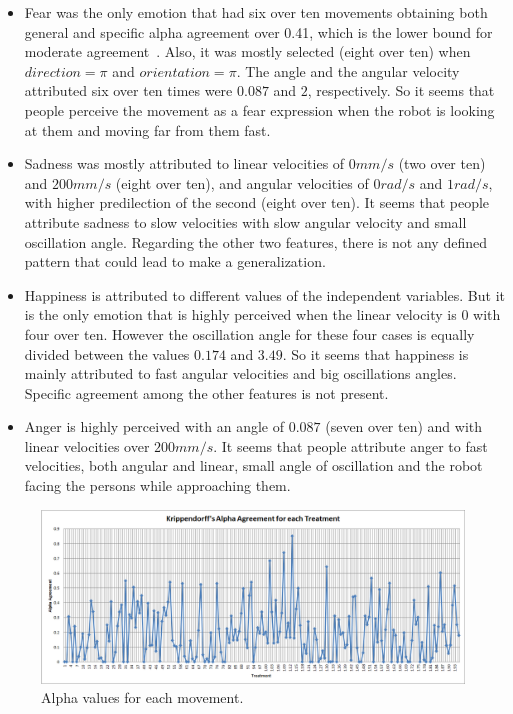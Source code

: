 \begin{itemize}

	\item Fear was the only emotion that had six over ten movements obtaining both general and specific alpha agreement over 0.41, which is the lower bound for moderate agreement~\cite{Viera2005}. Also, it was mostly selected (eight over ten) when $direction = \pi$ and $orientation = \pi$. The angle and the angular velocity attributed six over ten times were $0.087$ and $2$, respectively. So it seems that people perceive the movement as a fear expression when the robot is looking at them and moving far from them fast. 
	
	\item Sadness was mostly attributed to linear velocities of $0 mm/s$ (two over ten) and $200 mm/s$ (eight over ten), and angular velocities of $0 rad/s$ and $1 rad/s$, with higher predilection of the second (eight over ten). It seems that people attribute sadness to slow velocities with slow angular velocity and small oscillation angle. Regarding the other two features, there is not any defined pattern that could lead to make a generalization. 

	\item Happiness is attributed to different values of the independent variables. But it is the only emotion that is highly perceived when the linear velocity is $0$ with four over ten. However the oscillation angle for these four cases is equally divided between the values $0.174$ and $3.49$. %
So it seems that happiness is mainly attributed to fast angular velocities and big oscillations angles. Specific agreement among the other features is not present.

	\item Anger is highly perceived with an angle of $0.087$ (seven over ten) and with linear velocities over $200 mm/s$. It seems that people attribute anger to fast velocities, both angular and linear, small angle of oscillation and the robot facing the persons while approaching them. 
\end{itemize} 

\begin{figure}
	\centering
	\includegraphics[width=1.0\textwidth]{./Images/Alpha.png} 
	\caption{Alpha values for each movement.}
	\label{fig:alpha_experience}
\end{figure}


